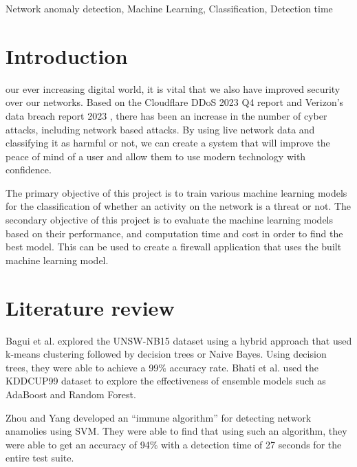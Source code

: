 \begin{IEEEkeywords}
Network anomaly detection, Machine Learning, Classification, Detection time
\end{IEEEkeywords}

\IEEEpeerreviewmaketitle



\section{Introduction}

 our ever increasing digital world, it is vital that we also have improved security over our networks. Based on the Cloudflare DDoS 2023 Q4 report \cite{cloudflare} and Verizon’s data breach report 2023 \cite{verizion}, there has been an increase in the number of cyber attacks, including network based attacks. By using live network data and classifying it as harmful or not, we can create a system that will improve the peace of mind of a user and allow them to use modern technology with confidence.

The primary objective of this project is to train various machine learning models for the classification of whether an activity on the network is a threat or not. The secondary objective of this project is to evaluate the machine learning models based on their performance, and computation time and cost in order to find the best model. This can be used to create a firewall application \cite{ucar2017analysis} that uses the built machine learning model.

\section{Literature review}
Bagui et al. explored the UNSW-NB15 dataset using a hybrid approach that used k-means clustering followed by decision trees or Naive Bayes. Using decision trees, they were able to achieve a 99\% accuracy rate. \cite{bagui2019using} Bhati et al. used the KDDCUP99 dataset to explore the effectiveness of ensemble models such as AdaBoost and Random Forest. \cite{bhati2022ensemble} 

Zhou and Yang  developed an ``immune algorithm'' for detecting network anamolies using SVM. They were able to find that using such an algorithm, they were able to get an accuracy of 94\% with a detection time of 27 seconds for the entire test suite. \cite{zhou2006using}

